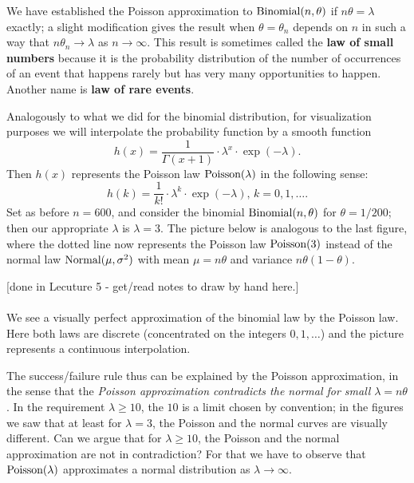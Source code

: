 We have established the Poisson approximation to $\mbox{{\rm Binomial}}(n,\theta)$ if $n\theta=\lambda $
exactly; a slight modification gives the result when $\theta=\theta_{n}$ depends on $n 
$ in such a way that $n\theta_{n}\rightarrow \lambda $ as $n\rightarrow \infty $.
This result is sometimes called the \textbf{law of small numbers }because it
is the probability distribution of the number of occurrences of an event
that happens rarely but has very many opportunities to happen. Another name
is {\bf law of rare events}.

Analogously to what we did for the binomial distribution, for visualization
purposes we will interpolate the probability function by a smooth function 
\begin{equation*}
h(x)=\frac{1}{\Gamma (x+1)}\cdot \lambda ^{x}\cdot \exp (-\lambda ).
\end{equation*}%
Then $h(x)$ represents the Poisson law $\mbox{{\rm Poisson}}(\lambda )$ in the
following sense: 
\begin{equation*}
h(k)=\frac{1}{k!}\cdot \lambda ^{k}\cdot \exp (-\lambda )\text{, }%
k=0,1,\ldots .
\end{equation*}%
Set as before $n=600$, and consider the binomial $\mbox{{\rm Binomial}}(n,\theta)$ for $\theta=1/200$;
then our appropriate $\lambda $ is $\lambda =3$. The picture below 
is analogous to the last figure, where the dotted line now
represents the Poisson law $\mbox{{\rm Poisson}}(3)$ instead of the normal law $\mbox{{\rm Normal}}(\mu
,\sigma ^{2})$ with mean $\mu =n\theta$ and variance $n\theta(1-\theta)$.


{\scriptsize [done in Lecuture 5 - get/read notes to draw by hand here.]}\\
\vspace{3cm} 
~\\


We see a visually perfect approximation of the binomial law by
the Poisson law. Here both laws are discrete (concentrated on the integers $%
0,1,\ldots $) and the picture represents a continuous interpolation.

The success/failure rule thus can be explained by the Poisson approximation,
in the sense that the \textit{Poisson approximation contradicts the normal
for small }$\lambda =n\theta$. In the requirement $\lambda \geq 10$, the $10$ is
a limit chosen by convention; in the figures we saw that at least for $%
\lambda =3$, the Poisson and the normal curves are visually different. Can
we argue that for $\lambda \geq 10$, the Poisson and the normal
approximation are not in contradiction? For that we have to observe that $%
\poisson(\lambda )$ approximates a normal distribution as $\lambda
\rightarrow \infty $. \bigskip

